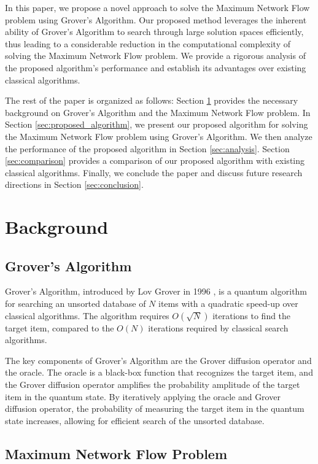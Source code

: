 In this paper, we propose a novel approach to solve the Maximum Network Flow problem using Grover's Algorithm. Our proposed method leverages the inherent ability of Grover's Algorithm to search through large solution spaces efficiently, thus leading to a considerable reduction in the computational complexity of solving the Maximum Network Flow problem. We provide a rigorous analysis of the proposed algorithm's performance and establish its advantages over existing classical algorithms.

The rest of the paper is organized as follows: Section \ref{sec:background} provides the necessary background on Grover's Algorithm and the Maximum Network Flow problem. In Section \ref{sec:proposed_algorithm}, we present our proposed algorithm for solving the Maximum Network Flow problem using Grover's Algorithm. We then analyze the performance of the proposed algorithm in Section \ref{sec:analysis}. Section \ref{sec:comparison} provides a comparison of our proposed algorithm with existing classical algorithms. Finally, we conclude the paper and discuss future research directions in Section \ref{sec:conclusion}.

\section{Background}
\label{sec:background}

\subsection{Grover's Algorithm}

Grover's Algorithm, introduced by Lov Grover in 1996 \cite{grover1996fast}, is a quantum algorithm for searching an unsorted database of $N$ items with a quadratic speed-up over classical algorithms. The algorithm requires $O(\sqrt{N})$ iterations to find the target item, compared to the $O(N)$ iterations required by classical search algorithms.

The key components of Grover's Algorithm are the Grover diffusion operator and the oracle. The oracle is a black-box function that recognizes the target item, and the Grover diffusion operator amplifies the probability amplitude of the target item in the quantum state. By iteratively applying the oracle and Grover diffusion operator, the probability of measuring the target item in the quantum state increases, allowing for efficient search of the unsorted database.

\subsection{Maximum Network Flow Problem}

